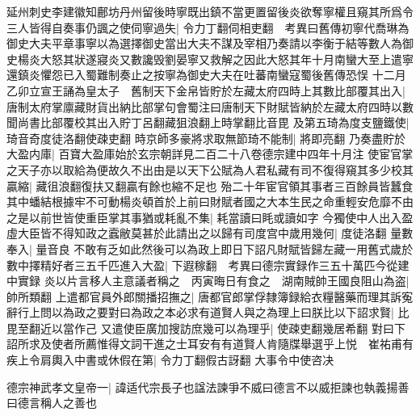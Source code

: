 延州刺史李建徽知鄜坊丹州留後時寧既出鎮不當更置留後炎欲奪寧權且窺其所爲令三人皆得自奏事仍諷之使伺寧過失|{
	令力丁翻伺相吏翻　考異曰舊傳初寧代喬琳為御史大夫平章事寧以為選擇御史當出大夫不謀及宰相乃奏請以李衡于結等數人為御史楊炎大怒其狀遂寢炎又數讒毁劉晏寧又救解之因此大怒其年十月南蠻大至上遣寧還鎮炎懼怨已入蜀難制奏止之按寧為御史大夫在吐蕃南蠻寇蜀後舊傳恐悮}
十二月乙卯立宣王誦為皇太子　舊制天下金帛皆貯於左藏太府四時上其數比部覆其出入|{
	唐制太府掌廪藏財貨出納比部掌句會蜀注曰唐制天下財賦皆納於左藏太府四時以數聞尚書比部覆校其出入貯丁呂翻藏狙浪翻上時掌翻比音毘}
及第五琦為度支鹽鐵使|{
	琦音奇度徒洛翻使疎吏翻}
時京師多豪將求取無節琦不能制|{
	將即亮翻}
乃奏盡貯於大盈内庫|{
	百寶大盈庫始於玄宗朝詳見二百二十八卷德宗建中四年十月注}
使宦官掌之天子亦以取給為便故久不出由是以天下公賦為人君私藏有司不復得窺其多少校其贏縮|{
	藏徂浪翻復扶又翻贏有餘也縮不足也}
殆二十年宦官領其事者三百餘員皆蠶食其中蟠結根據牢不可動楊炎頓首於上前曰財賦者國之大本生民之命重輕安危靡不由之是以前世皆使重臣掌其事猶或耗亂不集|{
	耗當讀曰眊或讀如字}
今獨使中人出入盈虛大臣皆不得知政之蠧敝莫甚於此請出之以歸有司度宫中歲用幾何|{
	度徒洛翻}
量數奉入|{
	量音良}
不敢有乏如此然後可以為政上即日下詔凡財賦皆歸左藏一用舊式歲於數中擇精好者三五千匹進入大盈|{
	下遐稼翻　考異曰德宗實録作三五十萬匹今從建中實録}
炎以片言移人主意議者稱之　丙寅晦日有食之　湖南賊帥王國良阻山為盗|{
	帥所類翻}
上遣都官員外郎關播招撫之|{
	唐都官郎掌俘隸簿録給衣糧醫藥而理其訴寃}
辭行上問以為政之要對曰為政之本必求有道賢人與之為理上曰朕比以下詔求賢|{
	比毘至翻近以當作己}
又遣使臣廣加搜訪庶幾可以為理乎|{
	使疎吏翻幾居希翻}
對曰下詔所求及使者所薦惟得文詞干進之士耳安有有道賢人肯隨牒舉選乎上悦　崔祐甫有疾上令肩輿入中書或休假在第|{
	令力丁翻假古訝翻}
大事令中使咨决

德宗神武孝文皇帝一|{
	諱适代宗長子也諡法諫爭不威曰德言不以威拒諫也執義揚善曰德言稱人之善也}


